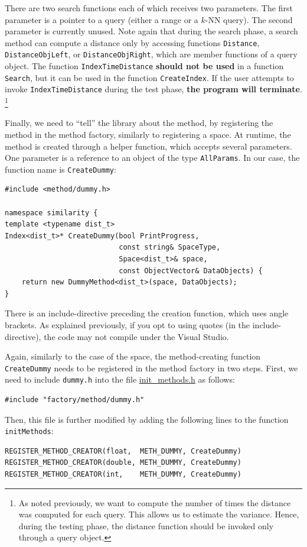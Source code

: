 \documentclass[runningheads,a4paper]{llncs}
\newcommand{\replocfile}{https://github.com/searchivarius/NonMetricSpaceLib/blob/pserv/}
\newcommand{\ttt}[1]{\texttt{#1}}
\newcommand{\knn}{$k$-NN }
\begin{document}
There are two search functions each of which receives two parameters.
The first parameter is a pointer to a query (either a range or a \knn query).
The second parameter is currently unused.
Note again that during the search phase, a search method can
compute a distance only by accessing functions \ttt{Distance}, \ttt{DistanceObjLeft}, or
\ttt{DistanceObjRight}, which are member functions of a query object.
The function \ttt{IndexTimeDistance} \textbf{should not be used} in a function \ttt{Search},
but it can be used in the function \ttt{CreateIndex}. 
If the user attempts to invoke \ttt{IndexTimeDistance} during the test phase,
\textbf{the program will terminate}.
\footnote{As noted previously, we want to compute the number of times
the distance was computed for each query. This allows us to estimate the variance.
Hence, during the testing phase, the distance function should be invoked only through
a query object.}


Finally, we need to ``tell'' the library about the method,
by registering the method in the method factory,
similarly to registering a space.
At runtime, the method is created through a helper function,
which accepts several parameters.
One parameter is a reference to an object of the type \ttt{AllParams}.
In our case, the function name is \ttt{CreateDummy}:

\begin{verbatim}
#include <method/dummy.h>

namespace similarity {
template <typename dist_t>
Index<dist_t>* CreateDummy(bool PrintProgress,
                           const string& SpaceType,
                           Space<dist_t>& space,
                           const ObjectVector& DataObjects) {
    return new DummyMethod<dist_t>(space, DataObjects);
}
\end{verbatim}
There is an include-directive preceding
the creation function, which uses angle brackets.
As explained previously, if you opt to using quotes (in the include-directive),
the code may not compile under the Visual Studio.

Again, similarly to the case of the space, 
the method-creating function \ttt{CreateDummy} needs
to be registered in the method factory in two steps.
First, we need to include \ttt{dummy.h} into the file
\href{\replocfile similarity_search/include/factory/init_methods.h}{init\_methods.h} as follows:
\begin{verbatim}
#include "factory/method/dummy.h"
\end{verbatim}
Then, this file is further modified by adding the following lines to the function \ttt{initMethods}:
\begin{verbatim}
REGISTER_METHOD_CREATOR(float,  METH_DUMMY, CreateDummy)
REGISTER_METHOD_CREATOR(double, METH_DUMMY, CreateDummy)
REGISTER_METHOD_CREATOR(int,    METH_DUMMY, CreateDummy)
\end{verbatim}
\end{document}
